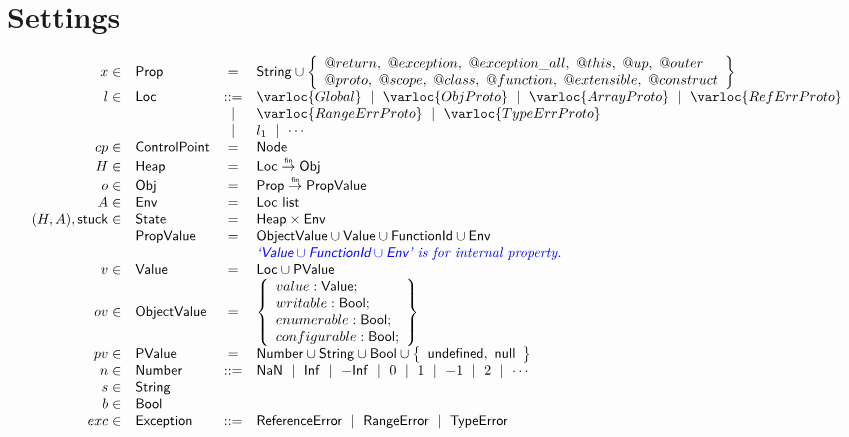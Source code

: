 \section{Settings}
\[
\begin{array}{rlcl}
x \in & \SF{Prop} & =  & \SF{String} \cup
                       \set{
                         \varprop{return},\ \varprop{exception},\ \varprop{exception\_all},\ \varprop{this},\
                         \varprop{up},\ \varprop{outer} \\
                         \varprop{proto},\ \varprop{scope},\ \varprop{class},\
                         \varprop{function},\ \varprop{extensible},\ \varprop{construct}
                       }\\
l \in & \SF{Loc}  & ::= & %
               \varloc{Global}
               ~\mid~ \varloc{ObjProto}
               ~\mid~ \varloc{ArrayProto}
               ~\mid~ \varloc{RefErrProto} \\
&&             \mid & \varloc{RangeErrProto}
               ~\mid~ \varloc{TypeErrProto}\\

&     & \mid  & l_1 ~\mid~ \cdots \\
cp \in & \SF{ControlPoint} & = & \SF{Node} \\
H \in & \SF{Heap} & =  & \SF{Loc} \finto \SF{Obj} \\
o \in & \SF{Obj}  & =  & \SF{Prop} \finto \SF{PropValue} \\
A \in & \SF{Env} & = & \SF{Loc}\listd \\
(H,A), \SF{stuck} \in & \SF{State} & = & \SF{Heap} \times \SF{Env} \\
      & \SF{PropValue} & = & \SF{ObjectValue} \cup \SF{Value} \cup \fid \cup \SF{Env} \\
      &       &    & \inblue \textit{`$\SF{Value}\cup \fid\cup \SF{Env}$' is for internal property.} \\
v \in & \SF{Value} & = & \SF{Loc} \cup \SF{PValue} \\
ov \in& \SF{ObjectValue} & = & \set{
                                   value: \SF{Value}; \\
                                   writable: \SF{Bool}; \\
                                   enumerable: \SF{Bool}; \\
                                   configurable: \SF{Bool}; \\
                                 } \\
pv\in & \SF{PValue}& = & \SF{Number}
                     \cup \SF{String}
                     \cup \SF{Bool}
                     \cup \set{\SF{undefined},\ \SF{null}} \\
n \in & \SF{Number} & ::= & \SF{NaN} ~\mid~ \SF{Inf} ~\mid~ -\SF{Inf} ~\mid~ 0 ~\mid~ 1 ~\mid~ -1 ~\mid~ 2 ~\mid~\cdots\\
s \in & \SF{String}\\
b \in & \SF{Bool} \\
exc \in & \SF{Exception} & ::= & \exc{ReferenceError} ~\mid~ \exc{RangeError} ~\mid~ \exc{TypeError}
\end{array}
\]

